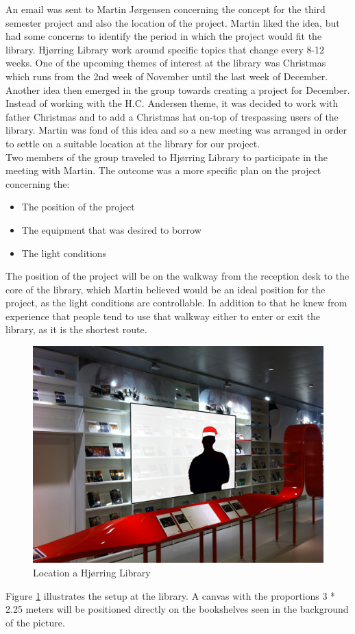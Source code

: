 An email was sent to Martin J{\o}rgensen concerning the concept for the third semester project and also the location of the project. Martin liked the idea, but had some concerns to identify the period in which the project would fit the library. Hj{\o}rring Library work around specific topics that change every 8-12 weeks. One of the upcoming themes of interest at the library was Christmas which runs from the 2nd week of November until the last week of December. Another idea then emerged in the group towards creating a project for December. Instead of working with the H.C. Andersen theme, it was decided to work with father Christmas and to add a Christmas hat on-top of trespassing users of the library. Martin was fond of this idea and so a new meeting was arranged in order to settle on a suitable location at the library for our project.\\
Two members of the group traveled to Hj{\o}rring Library to participate in the meeting with Martin. The outcome was a more specific plan on the project concerning the:

\begin{itemize}
\item The position of the project
\item The equipment that was desired to borrow
\item The light conditions
\end{itemize}

The position of the project will be on the walkway from the reception desk to the core of the library, which Martin believed would be an ideal position for the project, as the light conditions are controllable. In addition to that he knew from experience that people tend to use that walkway either to enter or exit the library, as it is the shortest route.

\begin{figure}[htbp]
\centering
\includegraphics[width=1.00\textwidth]{Pictures/HjoerringLibrary/LocationJohannesHat.jpg}
\caption{Location a Hjørring Library}
\label{fig:concept_art}
\end{figure}
Figure \ref{fig:concept_art} illustrates the setup at the library. A canvas with the proportions 3 * 2.25 meters will be positioned directly on the bookshelves seen in the background of the picture.

